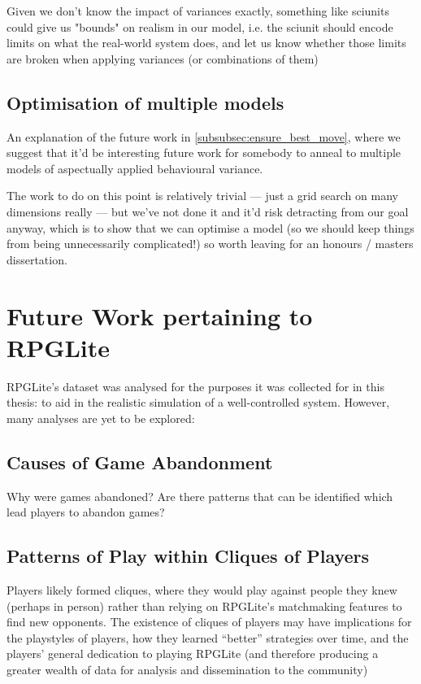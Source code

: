 Given we don't know the impact of variances exactly, something like sciunits
could give us "bounds" on realism in our model, i.e. the sciunit should encode
limits on what the real-world system does, and let us know whether those limits
are broken when applying variances (or combinations of them)


\subsection{Optimisation of multiple models}\label{many_aspectual_models_to_optimise}

An explanation of the future work in \cref{subsubsec:ensure_best_move}, where we
suggest that it'd be interesting future work for somebody to anneal to multiple
models of aspectually applied behavioural variance. 

The work to do on this point is relatively trivial --- just a grid search on
many dimensions really --- but we've not done it and it'd risk detracting from
our goal anyway, which is to show that we can optimise a model (so we should
keep things from being unnecessarily complicated!) so worth leaving for an
honours / masters dissertation.




\section{Future Work pertaining to RPGLite}\label{sec:future_work_rpglite}
RPGLite's dataset was analysed for the purposes it was collected for in this
thesis: to aid in the realistic simulation of a well-controlled \sociotechnical
system. However, many analyses are yet to be explored:

\subsection{Causes of Game Abandonment}
Why were games abandoned? Are there patterns that can be identified
which lead players to abandon games?
    
\subsection{Patterns of Play within Cliques of Players}
Players likely formed cliques, where they would play against people they knew
(perhaps in person) rather than relying on RPGLite's matchmaking features to
find new opponents. The existence of cliques of players may have implications
for the playstyles of players, how they learned ``better'' strategies over time,
and the players' general dedication to playing RPGLite (and therefore producing
a greater wealth of data for analysis and dissemination to the community)
    
